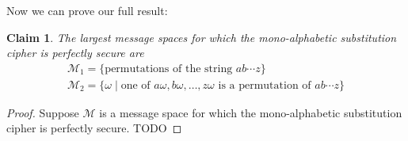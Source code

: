 \documentclass[12pt]{article}
\numberwithin{equation}{section}
\theoremstyle{plain}
\newtheorem{claim}{Claim}
\newcommand{\set}[1]{\{ #1 \}}
\newcommand{\ptexts}{\mathcal{M}}
\begin{document}
\begin{enumerate}
    Now we can prove our full result:
    \begin{claim}
    The largest message spaces
    for which the mono-alphabetic substitution cipher is perfectly secure
    are
    \begin{gather*}
        \ptexts_1 = \set{ \text{permutations of the string } ab\cdots z }\\
        \ptexts_2 = \set{ \omega \mid \text{one of } a\omega, b\omega, \ldots, z\omega \text{ is a permutation of } ab\cdots z }
    \end{gather*}
    \end{claim}
    \begin{proof}
    Suppose $\ptexts$ is a message space for which
    the mono-alphabetic substitution cipher is perfectly secure.
    TODO
    \end{proof}
\end{enumerate}
\end{document}
